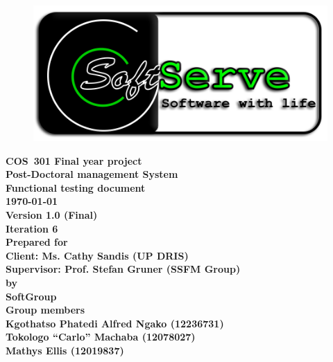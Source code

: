 \documentclass[12pt]{article}
\newcommand{\Title}{Functional testing document} %
\newcommand{\Class}{COS\ 301 Final year project} %
\newcommand{\ssr}{Soft\color{green}{Serve }\color{black}}
\newcommand{\version}{1.0 (Final)}
\newcommand{\iteration}{6}
\newcommand{\client}{Ms. Cathy Sandis (UP DRIS)}
\newcommand{\supervisor}{Prof. Stefan Gruner (SSFM Group)}
\newcommand{\project}{Post-Doctoral management System}
\begin{document}
\vspace{4em}

\begin{center}%

\begin{figure}[ht!]
\centering
\includegraphics{../Images_Docs/logo.png}
\end{figure}
\LARGE \bf \Class \\[0.25em]
\LARGE \bf \project \\[1em]
\LARGE \bf \Title \\[0.25em]
\large \bf \today\\
\bf Version \version\\
\bf Iteration \iteration\\[0.5em]
\Large \bf Prepared for \\Client: \client\\Supervisor: \supervisor
\Large \\\bf by \\
\Large {\bf \ssr Group }\\[0.5em]
\LARGE {\bf Group members}\\[0.25em]
\large
Kgothatso Phatedi Alfred Ngako (12236731) \\[0.5em]
Tokologo “Carlo” Machaba (12078027) \\[0.5em]
Mathys Ellis (12019837) \\[8em]

\end{center}%

\end{document}
